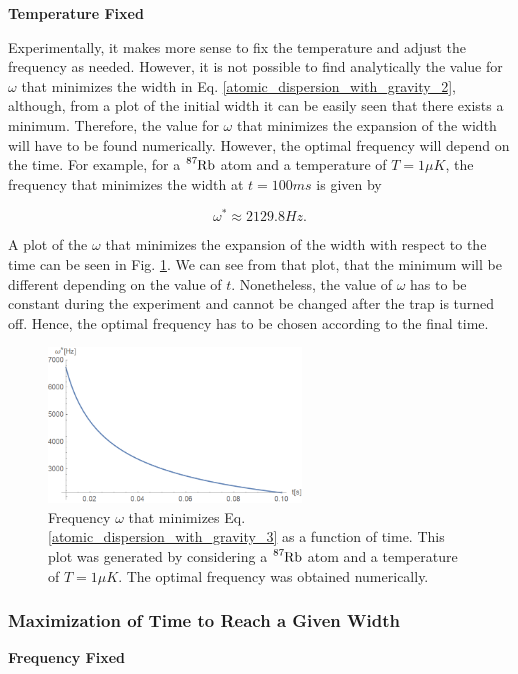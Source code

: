 \documentclass{article}
\begin{document}
\vspace{5mm}
\textbf{Temperature Fixed}

Experimentally, it makes more sense to fix the temperature and adjust the frequency as needed. However, it is not possible to find analytically the value for $\omega$ that minimizes the width in Eq. \ref{atomic_dispersion_with_gravity_2}, although, from a plot of the initial width it can be easily seen that there exists a minimum. Therefore, the value for $\omega$ that minimizes the expansion of the width will have to be found numerically. However, the optimal frequency will depend on the time. For example, for a $\ce{^{87}_{}Rb}$ atom and a temperature of $T=1\mu K$, the frequency that minimizes the width at $t=100ms$ is given by

\begin{equation}
    \omega^{*} \approx 2129.8 Hz.
\end{equation}

A plot of the $\omega$ that minimizes the expansion of the width with respect to the time can be seen in Fig. \ref{fig:optimal_frequency_vs_time}. We can see from that plot, that the minimum will be different depending on the value of $t$. Nonetheless, the value of $\omega$ has to be constant during the experiment and cannot be changed after the trap is turned off. Hence, the optimal frequency has to be chosen according to the final time.

\begin{figure}
\centering
\includegraphics[width=0.6\textwidth]{optimal_frequency_vs_time.png}
\caption{\label{fig:optimal_frequency_vs_time}Frequency $\omega$ that minimizes Eq. \ref{atomic_dispersion_with_gravity_3} as a function of time. This plot was generated by considering a $\ce{^{87}_{}Rb}$ atom and a temperature of $T=1\mu K$. The optimal frequency was obtained numerically.}
\end{figure}

\subsubsection{Maximization of Time to Reach a Given Width}
\textbf{Frequency Fixed}
\end{document}
